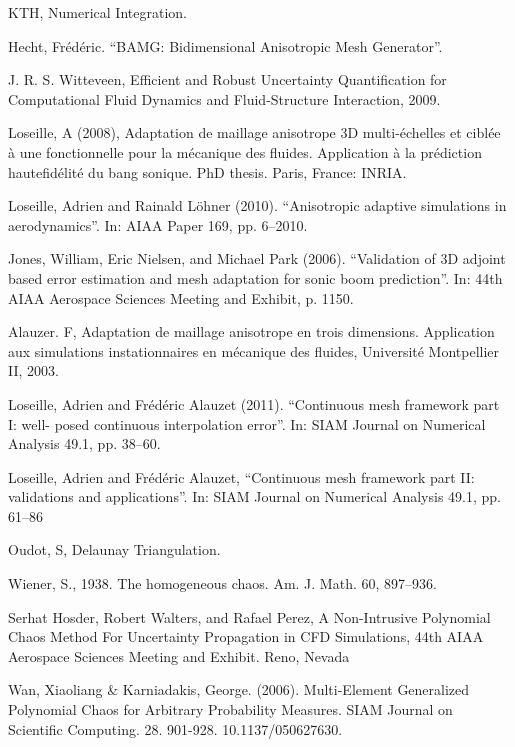 \documentclass[11pt, a4paper, English]{report}
\begin{document}
\begin{thebibliography}{50}
KTH, Numerical Integration.

Hecht, Frédéric. “BAMG: Bidimensional Anisotropic Mesh Generator”.

J. R. S. Witteveen, Efficient and Robust Uncertainty Quantification for Computational Fluid Dynamics and Fluid-Structure Interaction, 2009.

Loseille, A (2008), Adaptation de maillage anisotrope 3D multi-échelles et ciblée à
une fonctionnelle pour la mécanique des fluides. Application à la prédiction hautefidélité du bang sonique. PhD thesis. Paris, France: INRIA.

Loseille, Adrien and Rainald Löhner (2010). “Anisotropic adaptive simulations in aerodynamics”. In: AIAA Paper 169, pp. 6–2010.

Jones, William, Eric Nielsen, and Michael Park (2006). “Validation of 3D adjoint based error
estimation and mesh adaptation for sonic boom prediction”. In: 44th AIAA Aerospace
Sciences Meeting and Exhibit, p. 1150.

Alauzer. F,  Adaptation de maillage anisotrope en trois dimensions. Application aux simulations instationnaires en mécanique des fluides, Université Montpellier II, 2003.

Loseille, Adrien and Frédéric Alauzet (2011). “Continuous mesh framework part I: well-
posed  continuous  interpolation  error”.  In:
SIAM  Journal  on  Numerical  Analysis
49.1,
pp. 38–60.

 Loseille, Adrien and Frédéric Alauzet, “Continuous mesh framework part II: validations and applications”. In:
SIAM
Journal on Numerical Analysis
49.1, pp. 61–86

Oudot, S, Delaunay Triangulation.

Wiener, S., 1938. The homogeneous chaos. Am. J. Math. 60, 897–936.

Serhat Hosder, Robert Walters, and Rafael Perez,
 A Non-Intrusive Polynomial Chaos Method For Uncertainty Propagation in CFD Simulations, 44th AIAA Aerospace Sciences Meeting and Exhibit. Reno, Nevada
 
Wan, Xiaoliang & Karniadakis, George. (2006). Multi-Element Generalized Polynomial Chaos for Arbitrary Probability Measures. SIAM Journal on Scientific Computing. 28. 901-928. 10.1137/050627630. 


\end{thebibliography}
\end{document}

